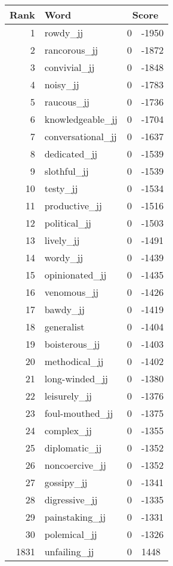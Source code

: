 \begin{longtable}[!htbp]{| rlr@{.}l |}
    \hline
    \textbf{Rank} & \textbf{Word} & \multicolumn{2}{c|}{\textbf{Score}} \\
    \hline
    \endhead
    1 & rowdy\_jj & 0 & -1950 \\
    2 & rancorous\_jj & 0 & -1872 \\
    3 & convivial\_jj & 0 & -1848 \\
    4 & noisy\_jj & 0 & -1783 \\
    5 & raucous\_jj & 0 & -1736 \\
    6 & knowledgeable\_jj & 0 & -1704 \\
    7 & conversational\_jj & 0 & -1637 \\
    8 & dedicated\_jj & 0 & -1539 \\
    9 & slothful\_jj & 0 & -1539 \\
    10 & testy\_jj & 0 & -1534 \\
    11 & productive\_jj & 0 & -1516 \\
    12 & political\_jj & 0 & -1503 \\
    13 & lively\_jj & 0 & -1491 \\
    14 & wordy\_jj & 0 & -1439 \\
    15 & opinionated\_jj & 0 & -1435 \\
    16 & venomous\_jj & 0 & -1426 \\
    17 & bawdy\_jj & 0 & -1419 \\
    18 & generalist & 0 & -1404 \\
    19 & boisterous\_jj & 0 & -1403 \\
    20 & methodical\_jj & 0 & -1402 \\
    21 & long-winded\_jj & 0 & -1380 \\
    22 & leisurely\_jj & 0 & -1376 \\
    23 & foul-mouthed\_jj & 0 & -1375 \\
    24 & complex\_jj & 0 & -1355 \\
    25 & diplomatic\_jj & 0 & -1352 \\
    26 & noncoercive\_jj & 0 & -1352 \\
    27 & gossipy\_jj & 0 & -1341 \\
    28 & digressive\_jj & 0 & -1335 \\
    29 & painstaking\_jj & 0 & -1331 \\
    30 & polemical\_jj & 0 & -1326 \\
    1831 & unfailing\_jj & 0 & 1448 \\

\end{longtable}
